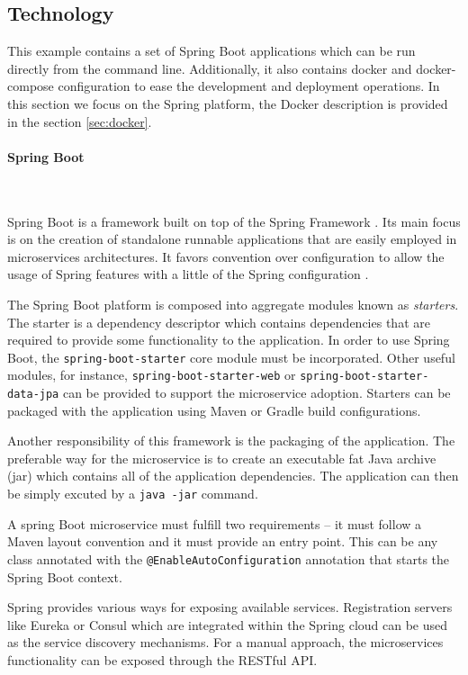 \documentclass[oneside,
  digital, %
  table,   %
  nolof,     %
  nolot,     %
]{fithesis3}
\newcommand{\newlinepar}[1]{\paragraph{#1}\needspace{4\baselineskip}\mbox{}\\}
\begin{document}
\subsection{Technology}

This example contains a set of Spring Boot applications which can be run directly from the command line. Additionally, it also contains docker and docker-compose configuration to ease the development and deployment operations. In this section we focus on the Spring platform, the Docker description is provided in the section \ref{sec:docker}.

\newlinepar{Spring Boot}
\label{sec:spring-boot}

Spring Boot is a framework built on top of the Spring Framework \cite{spring_ms}. Its main focus is on the creation of standalone runnable applications that are easily employed in microservices architectures. It favors convention over configuration to allow the usage of Spring features with a little of the Spring configuration \cite{spring_boot}.

The Spring Boot platform is composed into aggregate modules known as \textit{starters}. The starter is a dependency descriptor which contains dependencies that are required to provide some functionality to the application. In order to use Spring Boot, the \texttt{spring-boot-starter} core module must be incorporated. Other useful modules, for instance, \texttt{spring-boot-starter-web} or \texttt{spring-boot-starter-data-jpa} can be provided to support the microservice adoption. Starters can be packaged with the application using Maven or Gradle build configurations.

Another responsibility of this framework is the packaging of the application. The preferable way for the microservice is to create an executable fat Java archive (jar) which contains all of the application dependencies. The application can then be simply excuted by a \texttt{java -jar} command.

A spring Boot microservice must fulfill two requirements -- it must follow a Maven layout convention and it must provide an entry point. This can be any class annotated with the \texttt{@EnableAutoConfiguration} annotation that starts the Spring Boot context.

Spring provides various ways for exposing available services. Registration servers like Eureka or Consul which are integrated within the Spring cloud \cite{spring_cloud} can be used as the service discovery mechanisms. For a manual approach, the microservices functionality can be exposed through the RESTful API.
\end{document}
